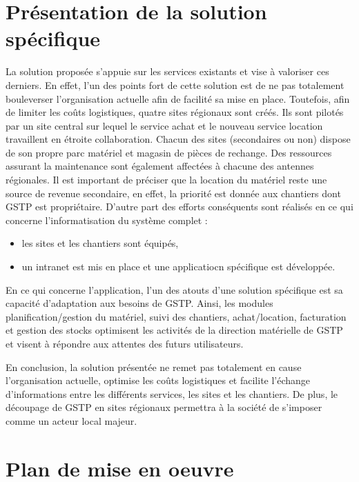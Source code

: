\section{Présentation de la solution spécifique}
La solution proposée s’appuie sur les services existants et vise à valoriser ces derniers. 
En effet, l’un des points fort de cette solution est de ne pas totalement bouleverser l’organisation actuelle afin de facilité sa mise en place.
Toutefois, afin de limiter les coûts logistiques, quatre sites régionaux sont créés. Ils sont pilotés par un site central sur lequel le service achat et le nouveau service location travaillent en étroite collaboration. Chacun des sites (secondaires ou non) dispose de son propre parc matériel et magasin de pièces de rechange. Des ressources assurant la maintenance sont également affectées à chacune des antennes régionales. 
Il est important de préciser que la location du matériel reste une source de revenue secondaire, en effet, la priorité est donnée aux chantiers dont GSTP est propriétaire.
D’autre part des efforts conséquents sont réalisés en ce qui concerne l’informatisation du système complet :
    \begin{itemize}
        \item les sites et les chantiers sont équipés,
        \item un intranet est mis en place et une applicatiocn spécifique est développée.
    \end{itemize}

En ce qui concerne l’application, l’un des atouts d’une solution spécifique est sa capacité d’adaptation aux besoins de GSTP. 
Ainsi, les modules planification/gestion du matériel, suivi des chantiers, achat/location, facturation et gestion des stocks optimisent les activités de la direction matérielle de GSTP et visent à répondre aux attentes des futurs utilisateurs.

En conclusion, la solution présentée ne remet pas totalement en cause l’organisation actuelle, optimise les coûts logistiques et facilite l’échange d’informations entre les différents services, les sites et les chantiers. 
De plus, le découpage de GSTP en sites régionaux permettra à la société de s’imposer comme un acteur local majeur.


\section{Plan de mise en oeuvre}
    
